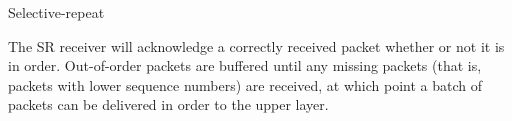 \begin{frame}
  \begin{iblock}{Selective-repeat}
    \begin{center}
    \end{center}
  \end{iblock}
\end{frame}

The SR receiver will acknowledge a correctly received packet whether or not it is in
order. Out-of-order packets are buffered until any missing packets (that is, packets with
lower sequence numbers) are received, at which point a batch of packets can be delivered
in order to the upper layer. 

